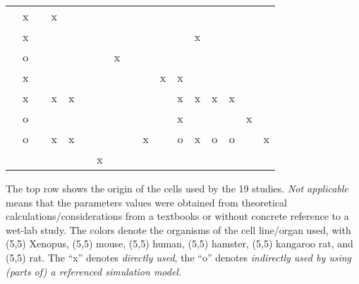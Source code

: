\documentclass[10pt,letterpaper]{article}
\begin{document}
\begin{table}[!ht]
\begin{adjustwidth}{-0.8in}{0in}
\begin{tabular}{lcccccccccccccccc}
\cite{Kogan2012} & \colorbox{color1}{x} 	& & \colorbox{color2}{x} 	& & & & & & & & & & & & &  \\
\cite{Mazemondet2012} 	& \colorbox{color1}{x} 	& & & & & & & & & & & \colorbox{color3}{x} 	& & & &  \\
\cite{Wang2013}  & \colorbox{color1}{o} 	& & & & & & \colorbox{color2}{x} 	& & & & & & & & &  \\
\cite{Chen2014}  & \colorbox{color1}{x} 	& & & & & & & & & \colorbox{color3}{x} & \colorbox{color3}{x} & & & & &  \\
\cite{Haack2015} & \colorbox{color1}{x} 	& & \colorbox{color2}{x} & \colorbox{color2}{x} & & & & & & & \colorbox{color3}{x} 	& \colorbox{color3}{x} & \colorbox{color4}{x} 	& \colorbox{color5}{x} 	& &  \\
\cite{Padala2017} 	& \colorbox{color1}{o} 	& & & & & & & & & & \colorbox{color3}{x} & & & & \colorbox{color6}{x} 	&  \\
\cite{Haack2020} & \colorbox{color1}{o} 	& & \colorbox{color2}{x} 	& \colorbox{color2}{x} 	& & & & & \colorbox{color3}{x} 	& & \colorbox{color3}{o} 	& \colorbox{color3}{x} 	& \colorbox{color4}{o} 	& \colorbox{color5}{o} 	& & x \\
\cite{Staehlke2020} 	& &		&		& & & \colorbox{color2}{x} & &		&		& & & & & & &  \\
\end{tabular}
\begin{flushleft}
The top row shows the origin of the cells used by the 19 studies.
\textit{Not applicable} means that the parameters values were obtained from theoretical calculations/considerations from a textbooks or without concrete reference to a wet-lab study.
The colors denote the organisms of the cell line/organ used, with \colorbox{color1}{\makebox(5,5){}} Xenopus, \colorbox{color2}{\makebox(5,5){}} mouse, \colorbox{color3}{\makebox(5,5){}} human, \colorbox{color4}{\makebox(5,5){}} hamster, \colorbox{color5}{\makebox(5,5){}} kangaroo rat, and \colorbox{color6}{\makebox(5,5){}} rat.
The \enquote{x} denotes \textit{directly used}, the \enquote{o} denotes \textit{indirectly used by using (parts of) a referenced simulation model}.
\end{flushleft}
\label{tab:CellLines}
\end{adjustwidth}
\end{table}
\end{document}
